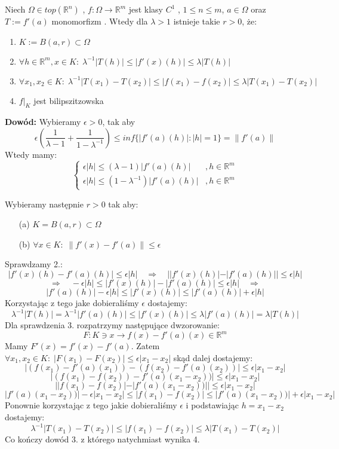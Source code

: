 \begin{lem}
	Niech $\Omega \in top(\mathbb{R}^n)$ , $f: \Omega \rightarrow \mathbb{R}^m$ jest klasy $C^1$ , $1 \leq n \leq m$, $a \in \Omega$ oraz $T:= f'(a)$ monomorfizm . Wtedy dla $\lambda>1$ istnieje takie $r>0$, że:
	\begin{enumerate}
		\item $K:=B(a,r) \subset \Omega$ 
		\item $\forall h \in \mathbb{R}^m, x \in K: \; \lambda^{-1}|T(h)| \leq |f'(x)(h)| \leq \lambda|T(h)|$ 
		\item $\forall x_1, x_2 \in K: \; \lambda^{-1}|T(x_1) - T(x_2)| \leq |f(x_1) - f(x_2)| \leq \lambda|T(x_1) - T(x_2)|$ 
		\item $f|_K$ jest bilipszitzowska
	\end{enumerate}

	\textbf{Dowód:}\newline
	Wybieramy $\epsilon > 0$, tak aby $$
		\epsilon (\frac{1}{\lambda-1} + \frac{1}{1 - \lambda^{-1}}) \leq inf\{|f'(a)(h)|: |h|=1\} = \|f'(a)\|
	$$
	Wtedy mamy: 
	\begin{equation}
		\begin{cases}
		\epsilon |h| \leq (\lambda-1) |f'(a)(h)| & , h \in \mathbb{R}^m \\
		\epsilon |h| \leq (1 - \lambda^{-1}) |f'(a)(h)| & , h \in \mathbb{R}^m
		\end{cases}
	\end{equation}

	Wybieramy następnie $r>0$ tak aby:
	\begin{enumerate}
		\item[(a)] $K = B(a,r) \subset \Omega$ 
		\item[(b)] $\forall x \in K: \; \| f'(x) - f'(a) \| \leq \epsilon$
	\end{enumerate}
	Sprawdzamy 2.: 
	$$ 
		|f'(x)(h) - f'(a)(h)| \leq \epsilon|h| \quad \Longrightarrow \quad
		||f'(x)(h)| - |f'(a)(h)|| \leq \epsilon|h| 
	$$
	$$
		\quad \Longrightarrow \quad
		-\epsilon|h| \leq |f'(x)(h)| - |f'(a)(h)| \leq \epsilon|h| \quad \Longrightarrow \quad
	$$
	$$
		|f'(a)(h)| - \epsilon|h| \leq |f'(x)(h)| \leq |f'(a)(h)| + \epsilon|h|
	$$
	Korzystając z tego jake dobieraliśmy $\epsilon$ dostajemy: $$
		\lambda^{-1}|T(h)| = \lambda^{-1}|f'(a)(h)| \leq |f'(x)(h)| \leq \lambda|f'(a)(h)| = \lambda|T(h)|
	$$
	Dla sprawdzenia 3. rozpatrzymy następujące dwzorowanie: $$
		F: K \ni x \rightarrow f(x) - f'(a)(x) \in \mathbb{R}^m
	$$
	Mamy $F'(x) = f'(x) - f'(a)$. Zatem $\forall x_1, x_2 \in K: \; |F(x_1) - F(x_2)| \leq \epsilon |x_1 - x_2|$ skąd dalej dostajemy: $$
		|(f(x_1) - f'(a)(x_1)) - (f(x_2) - f'(a)(x_2))| \leq \epsilon|x_1 - x_2|
	$$
	$$
		|(f(x_1) - f(x_2)) - f'(a)(x_1-x_2))| \leq \epsilon|x_1 - x_2|
	$$
	$$
		||f(x_1) - f(x_2)| - |f'(a)(x_1-x_2))|| \leq \epsilon|x_1 - x_2|
	$$
	$$
		|f'(a)(x_1-x_2))| - \epsilon|x_1 - x_2| \leq |f(x_1) - f(x_2)| \leq |f'(a)(x_1-x_2))| + \epsilon|x_1 - x_2|
	$$
	Ponownie korzystając z tego jakie dobieraliśmy $\epsilon$ i podstawiając $h = x_1 - x_2$ dostajemy: $$
		\lambda^{-1}|T(x_1) - T(x_2)| \leq |f(x_1) - f(x_2)| \leq \lambda | T(x_1) - T(x_2)|
	$$
	Co kończy dowód 3. z którego natychmiast wynika 4.

\end{lem}